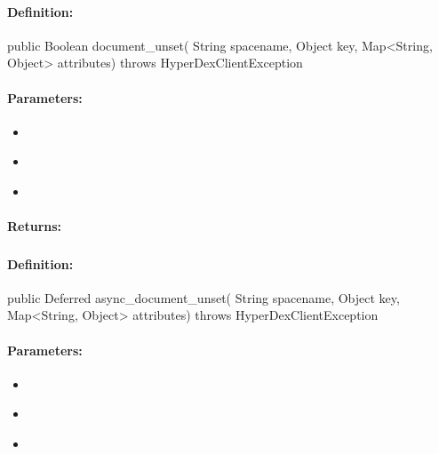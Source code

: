 \paragraph{Definition:}
\begin{javacode}
public Boolean document_unset(
        String spacename,
        Object key,
        Map<String, Object> attributes) throws HyperDexClientException
\end{javacode}

\paragraph{Parameters:}
\begin{itemize}[noitemsep]
\item {}\\

\item {}\\

\item {}\\

\end{itemize}

\paragraph{Returns:}


\pagebreak
\subsubsection{}
\label{api:java:async_document_unset}


\paragraph{Definition:}
\begin{javacode}
public Deferred async_document_unset(
        String spacename,
        Object key,
        Map<String, Object> attributes) throws HyperDexClientException
\end{javacode}

\paragraph{Parameters:}
\begin{itemize}[noitemsep]
\item {}\\

\item {}\\

\item {}\\

\end{itemize}

